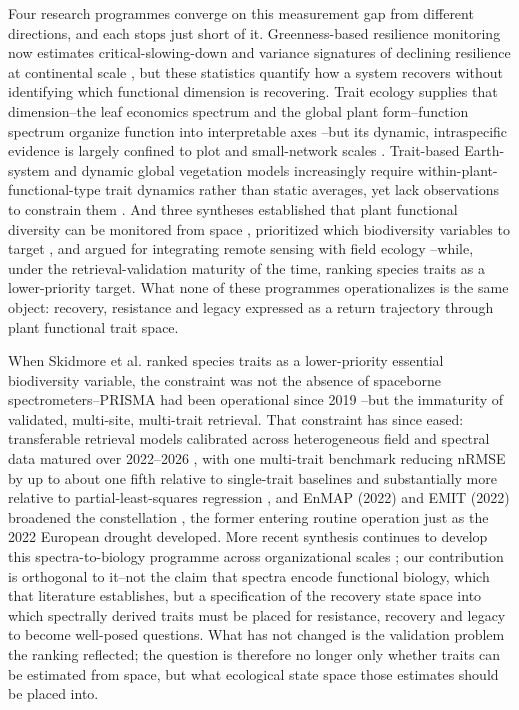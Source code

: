 \documentclass[pdflatex,sn-mathphys-num]{sn-jnl}
\begin{document}
Four research programmes converge on this measurement gap from different directions, and each stops just short of it. Greenness-based resilience monitoring now estimates critical-slowing-down and variance signatures of declining resilience at continental scale \cite{scheffer2009early,smith2022resilience,tai2023linking}, but these statistics quantify how a system recovers without identifying which functional dimension is recovering. Trait ecology supplies that dimension--the leaf economics spectrum and the global plant form--function spectrum organize function into interpretable axes \cite{wright2004leafeconomic,reich2014worldwide,diaz2016global,joswig2022climatic,bruelheide2018global}--but its dynamic, intraspecific evidence is largely confined to plot and small-network scales \cite{violle2012returnfunctional,albert2010multitrait,siefert2015global,westerband2021intraspecific}. Trait-based Earth-system and dynamic global vegetation models increasingly require within-plant-functional-type trait dynamics rather than static averages, yet lack observations to constrain them \cite{xu2021trait,kattge2020try}. And three syntheses established that plant functional diversity can be monitored from space \cite{jetz2016monitoring}, prioritized which biodiversity variables to target \cite{skidmore2021priority}, and argued for integrating remote sensing with field ecology \cite{cavenderbares2022}--while, under the retrieval-validation maturity of the time, ranking species traits as a lower-priority target. What none of these programmes operationalizes is the same object: recovery, resistance and legacy expressed as a return trajectory through plant functional trait space.

When Skidmore et al. \cite{skidmore2021priority} ranked species traits as a lower-priority essential biodiversity variable, the constraint was not the absence of spaceborne spectrometers--PRISMA had been operational since 2019 \cite{cogliati2021prisma}--but the immaturity of validated, multi-site, multi-trait retrieval. That constraint has since eased: transferable retrieval models calibrated across heterogeneous field and spectral data matured over 2022--2026 \cite{cherif2023spectra,ji2024transferability,ji2025transferlearning,mederer2025plant,wu2026gsti}, with one multi-trait benchmark reducing nRMSE by up to about one fifth relative to single-trait baselines and substantially more relative to partial-least-squares regression \cite{cherif2023spectra}, and EnMAP (2022) and EMIT (2022) broadened the constellation \cite{chabrillat2024enmap,thompson2023orbit}, the former entering routine operation just as the 2022 European drought developed. More recent synthesis continues to develop this spectra-to-biology programme across organizational scales \cite{cavenderbares2025spectral}; our contribution is orthogonal to it--not the claim that spectra encode functional biology, which that literature establishes, but a specification of the recovery state space into which spectrally derived traits must be placed for resistance, recovery and legacy to become well-posed questions. What has not changed is the validation problem the ranking reflected; the question is therefore no longer only whether traits can be estimated from space, but what ecological state space those estimates should be placed into.
\end{document}
